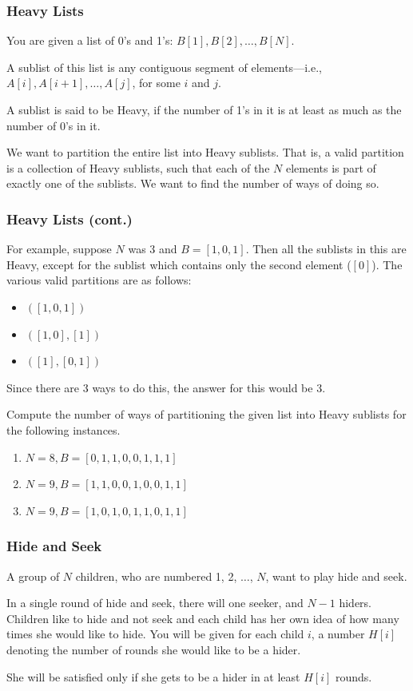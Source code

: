 \documentclass{beamer}
\begin{document}
\begin{frame}[fragile]
\frametitle{Heavy Lists}

You are given a list of 0's and 1's: $B[1], B[2], \ldots, B[N]$.

A sublist of this list is any contiguous segment of elements---i.e., $A[i], A[i + 1], \ldots, A[j]$, for some $i$ and $j$.

A sublist is said to be Heavy, if the number of 1's in it is at least as much as the number of 0's in it.

We want to partition the entire list into Heavy sublists. That is, a valid partition is a collection of Heavy sublists, such that each of the $N$ elements is part of exactly one of the sublists. We want to find the number of ways of doing so.

\end{frame}

\begin{frame}
\frametitle{Heavy Lists (cont.)}
For example, suppose $N$ was 3 and $B = [1, 0, 1]$. Then all the sublists in this are Heavy, except for the sublist which contains only the second element ($[0]$). The various valid partitions are as follows:
\begin{itemize}
\item $([1, 0, 1])$
\item $([1, 0], [1])$
\item $([1], [0, 1])$
\end{itemize}

Since there are 3 ways to do this, the answer for this would be 3.

Compute the number of ways of partitioning the given list into Heavy sublists for the following instances.

\begin{enumerate}
\item[(a)] $N = 8, B = [0, 1, 1, 0, 0, 1, 1, 1]$
\item[(b)] $N = 9, B = [1, 1, 0, 0, 1, 0, 0, 1, 1]$
\item[(c)] $N = 9, B = [1, 0, 1, 0, 1, 1, 0, 1, 1]$
\end{enumerate}
\end{frame}

\begin{frame}
\end{frame}

\begin{frame}[fragile]
\frametitle{Hide and Seek}

A group of $N$ children, who are numbered 1, 2, $\ldots$, $N$, want to play hide and seek.

In a single round of hide and seek, there will one seeker, and $N - 1$ hiders. Children like to hide and not seek and each child has her own idea of how many times she would like to hide. You will be given for each child $i$, a number $H[i]$ denoting the number of rounds she would like to be a hider.

She will be satisfied only if she gets to be a hider in at least $H[i]$ rounds.
\end{frame}
\end{document}
